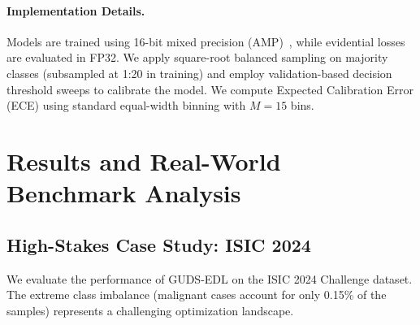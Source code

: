 \documentclass[letterpaper]{article} %
\begin{document}
\paragraph{Implementation Details.} Models are trained using 16-bit mixed precision (AMP)~\cite{micikevicius2018mixed}, while evidential losses are evaluated in FP32. We apply square-root balanced sampling on majority classes (subsampled at 1:20 in training) and employ validation-based decision threshold sweeps to calibrate the model. We compute Expected Calibration Error (ECE) using standard equal-width binning with $M=15$ bins.

\section{Results and Real-World Benchmark Analysis}\label{sec:results}

\subsection{High-Stakes Case Study: ISIC 2024}\label{subsec:isic_case_study}
We evaluate the performance of GUDS-EDL on the ISIC 2024 Challenge dataset. The extreme class imbalance (malignant cases account for only 0.15\% of the samples) represents a challenging optimization landscape.
\end{document}
